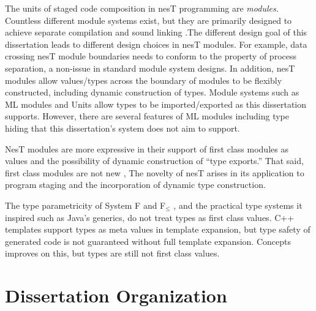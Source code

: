 The units of staged code composition in nesT programming are \emph{modules}. Countless different
module systems exist, but they are primarily designed to achieve separate compilation and sound
linking \cite{Cardelli-1997}.The different design goal of this dissertation leads to different
design choices in nesT modules. For example, data crossing nesT module boundaries needs to
conform to the property of process separation, a non-issue in standard module system designs. In
addition, nesT modules allow values/types across the boundary of modules to be flexibly
constructed, including dynamic construction of types. Module systems such as ML modules
\cite{macqueen84} and Units \cite{flatt98units} allow types to be imported/exported as this
dissertation supports. However, there are several features of ML modules including type hiding
that this dissertation's system does not aim to support.

NesT modules are more expressive in their support of first class modules as values and the
possibility of dynamic construction of ``type exports.'' That said, first class modules are not
new \cite{99620,ancona01calculus}, The novelty of nesT arises in its application to program
staging and the incorporation of dynamic type construction.

The type parametricity of System F and F$_\le$ \cite{Cardelli-1985}, and the practical type
systems it inspired such as Java's generics, do not treat types as first class values. C++
templates support types as meta values in template expansion, but type safety of generated code
is not guaranteed without full template expansion. Concepts \cite{gregor06:_concepts} improves
on this, but types are still not first class values.

\section{Dissertation Organization}

